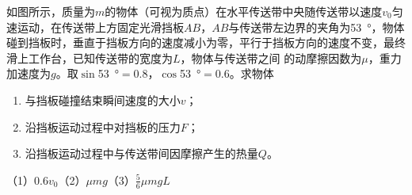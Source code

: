 如图所示，质量为\(m\)的物体（可视为质点）在水平传送带中央随传送带以速度\(v_0\)匀速运动，在传送带上方固定光滑挡板\(AB\)，\(AB\)与传送带左边界的夹角为\qty{53}{\degree}，物体碰到挡板时，垂直于挡板方向的速度减小为零，平行于挡板方向的速度不变，最终滑上工作台，已知传送带的宽度为\(L\)，物体与传送带之间	的动摩擦因数为\(\mu\)，重力加速度为\(g\)。取\(\sin\)\qty{53}{\degree}\(= 0.8\)，\(\cos\)\qty{53}{\degree}\(= 0.6\)。求物体
\begin{enumerate}
	\item 与挡板碰撞结束瞬间速度的大小\(v\)；
	\item 沿挡板运动过程中对挡板的压力\(F\)；
	\item 沿挡板运动过程中与传送带间因摩擦产生的热量\(Q\)。
\end{enumerate}

\begin{answer}
    （1）\(0.6v_0\)（2）\(\mu mg\)（3）\(\frac{5}{6}\mu mgL\)
\end{answer}